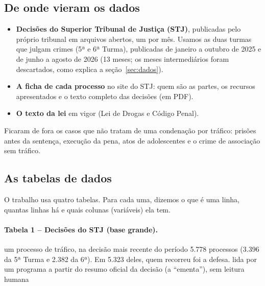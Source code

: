 \subsection*{De onde vieram os dados}

\begin{itemize}
  \item \textbf{Decisões do Superior Tribunal de Justiça (STJ)}, publicadas pelo próprio
        tribunal em arquivos abertos, um por mês. Usamos as duas turmas que julgam
        crimes (5ª e 6ª Turma), publicadas de janeiro a outubro de 2025 e de junho a
        agosto de 2026 (13 meses; os meses intermediários foram descartados, como explica a
        seção~\ref{sec:dados}).
  \item \textbf{A ficha de cada processo} no site do STJ: quem são as partes, os recursos
        apresentados e o texto completo das decisões (em PDF).
  \item \textbf{O texto da lei} em vigor (Lei de Drogas e Código Penal).
\end{itemize}

Ficaram de fora os casos que não tratam de uma condenação por tráfico: prisões antes da
sentença, execução da pena, atos de adolescentes e o crime de associação sem tráfico.

\subsection*{As tabelas de dados}

O trabalho usa quatro tabelas. Para cada uma, dizemos o que é uma linha, quantas
linhas há e quais colunas (variáveis) ela tem.

\paragraph*{Tabela 1 -- Decisões do STJ (base grande).}
      {um processo de tráfico, na decisão mais recente do período}
      {5.778 processos (3.396 da 5ª Turma e 2.382 da 6ª). Em 5.323 deles, quem recorreu foi a defesa.}
      {lida por um programa a partir do resumo oficial da decisão (a ``ementa''), sem leitura humana}

